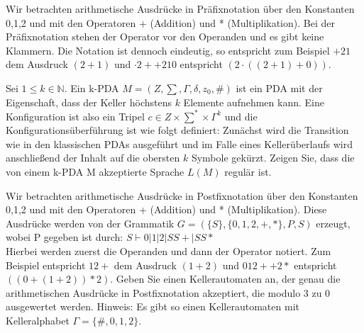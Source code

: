 \documentclass[10pt, a4paper]{exam}
\begin{document}
\begin{questions}
    \question Wir betrachten arithmetische Ausdrücke in Präfixnotation über den Konstanten 0,1,2 und mit den Operatoren + (Addition) und * (Multiplikation). Bei der Präfixnotation stehen der Operator vor den Operanden und es gibt keine Klammern. Die Notation ist dennoch eindeutig, so entspricht zum Beispiel $+21$ dem Ausdruck $(2 + 1)$ und $·2++210$ entspricht $(2 · ((2 + 1) + 0))$.

    \question Sei $1\leq k \in\mathbb{N}$. Ein k-PDA $M = (Z ,\sum, \Gamma, \delta, z_0 , \#)$ ist ein PDA mit der Eigenschaft, dass der Keller höchstens $k$ Elemente aufnehmen kann. Eine Konfiguration ist also ein Tripel $c\in Z \times\sum^*\times\Gamma^k$ und die Konfigurationsüberführung ist wie folgt definiert: Zunächst wird die Transition wie in den klassischen PDAs ausgeführt und im Falle eines Kellerüberlaufs wird anschließend der Inhalt auf die obersten $k$ Symbole gekürzt. Zeigen Sie, dass die von einem k-PDA M akzeptierte Sprache $L(M)$ regulär ist.
    \begin{solution}
    \end{solution}

    \question Wir betrachten arithmetische Ausdrücke in Postfixnotation über den Konstanten 0,1,2 und mit den Operatoren + (Addition) und * (Multiplikation). Diese Ausdrücke werden von der Grammatik $G = (\{S\}, \{0, 1, 2, +, *\}, P, S)$ erzeugt, wobei P gegeben ist durch: $S \vdash 0 | 1 | 2 | SS+ | SS*$\\
    Hierbei werden zuerst die Operanden und dann der Operator notiert. Zum Beispiel entspricht $12+$ dem Ausdruck $(1+2)$ und $012++2*$ entspricht $((0+(1+2))*2)$. Geben Sie einen Kellerautomaten an, der genau die arithmetischen Ausdrücke in Postfixnotation akzeptiert, die modulo 3 zu 0 ausgewertet werden.
    Hinweis: Es gibt so einen Kellerautomaten mit Kelleralphabet $\Gamma = \{\#, 0, 1, 2\}$.
    \begin{solution}
    \end{solution}


\end{questions}
\end{document}
